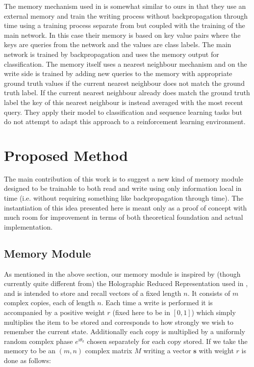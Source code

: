 \documentclass{article}
\begin{document}
The memory mechanism used in \cite{RARE} is somewhat similar to ours in that they use an external memory and train the writing process without backpropagation through time using a training process separate from but coupled with the training of the main network. In this case their memory is based on key value pairs where the keys are queries from the network and the values are class labels. The main network is trained by backpropagation and uses the memory output for classification. The memory itself uses a nearest neighbour mechanism and on the write side is trained by adding new queries to the memory with appropriate ground truth values if the current nearest neighbour does not match the ground truth label. If the current nearest neighbour already does match the ground truth label the key of this nearest neighbour is instead averaged with the most recent query. They apply their model to classification and sequence learning tasks but do not attempt to adapt this approach to a reinforcement learning environment.

\section*{Proposed Method}
The main contribution of this work is to suggest a new kind of memory module designed to be trainable to both read and write using only information local in time (i.e. without requiring something like backpropagation through time). The instantiation of this idea presented here is meant only as a proof of concept with much room for improvement in terms of both theoretical foundation and actual implementation.
\subsection*{Memory Module}
As mentioned in the above section, our memory module is inspired by (though currently quite different from) the Holographic Reduced Representation used in \cite{LSTM}, and is intended to store and recall vectors of a fixed length $n$. It consists of $m$ complex copies, each of length $n$. Each time a write is performed it is accompanied by a positive weight $r$ (fixed here to be in $[0,1]$) which simply multiplies the item to be stored and corresponds to how strongly we wish to remember the current state. Additionally each copy is multiplied by a uniformly random complex phase $e^{i\theta_k}$ chosen separately for each copy stored. If we take the memory to be an $(m,n)$ complex matrix $M$ writing a vector $\pmb{s}$ with weight $r$ is done as follows:
\end{document}

